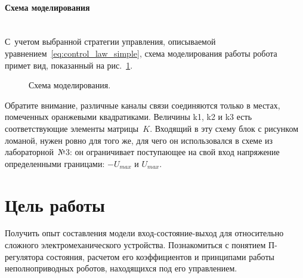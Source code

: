 \documentclass[12pt,a4paper,openany]{extarticle}
\begin{document}
\paragraph*{Схема моделирования}$\phantom{-}$ \\
\hspace*{\parindent}С~учетом выбранной стратегии управления, описываемой уравнением~\eqref{eq:control_law_simple}, схема моделирования работы робота примет вид, показанный на рис.~\ref{struct_sheme}.
\begin{figure}[h]
	\caption{Схема моделирования.}
	\label{struct_sheme}
\end{figure}

Обратите внимание, различные каналы связи соединяются только в местах, помеченных оранжевыми квадратиками.
Величины k1, k2 и k3 есть соответствующие элементы матрицы~$K$.
Входящий в эту схему блок с рисунком ломаной, нужен ровно для того же, для чего он использовался в схеме из лабораторной~№3: он ограничивает поступающее на свой вход напряжение определенными границами: $-U_{max}$ и $U_{max}$. 

\newpage
\section{Цель работы}
\hspace*{\parindent}Получить опыт составления модели вход-состояние-выход для относительно сложного электромеханического устройства.
Познакомиться с понятием П-регулятора состояния, расчетом его коэффициентов и принципами работы неполноприводных роботов, находящихся под его управлением.
\end{document}
